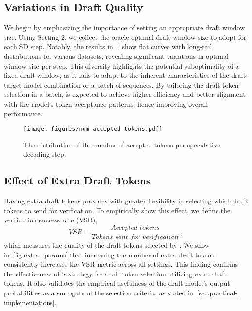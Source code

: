 \subsection{Variations in Draft Quality}\label{sec:variation-draft-quality}

We begin by emphasizing the importance of setting an appropriate draft window size.
Using Setting 2, we collect the oracle optimal draft window size to adopt for each SD step.
Notably, the results in~\cref{fig:accepted_tokens} show flat curves with long-tail distributions for various datasets, revealing significant variations in optimal window size per step.
This diversity highlights the potential suboptimality of a fixed draft window, as it fails to adapt to the inherent characteristics of the draft-target model combination or a batch of sequences.
By tailoring the draft token selection in a batch, \alg{} is expected to achieve higher efficiency and better alignment with the model's token acceptance patterns, hence improving overall performance.
\begin{figure}[!ht]
    \centering
    \texttt{[image: figures/num\_accepted\_tokens.pdf]}
    \vspace{-3mm}
    \caption{The distribution of the number of accepted tokens per speculative decoding step.}
    \label{fig:accepted_tokens}
\end{figure}

\subsection{Effect of Extra Draft Tokens}\label{sec:effect-extra-proposal}

Having extra draft tokens provides \alg{} with greater flexibility in selecting which draft tokens to send for verification.
To empirically show this effect, we define the verification success rate (VSR), 
\begin{equation}\label{eq:VSR}
   \textstyle \textit{VSR} = \frac{\textit{Accepted tokens}}{\textit{Tokens sent for verification}} \ ,
\end{equation}
which measures the quality of the draft tokens selected by \alg{}.
We show in~\cref{fig:extra_params} that increasing the number of extra draft tokens consistently increases the VSR metric across all settings.
This finding confirms the effectiveness of \alg{}'s strategy for draft token selection utilizing extra draft tokens.
It also validates the empirical usefulness of the draft model's output probabilities as a surrogate of the selection criteria, as stated in~\cref{sec:practical-implementations}.

